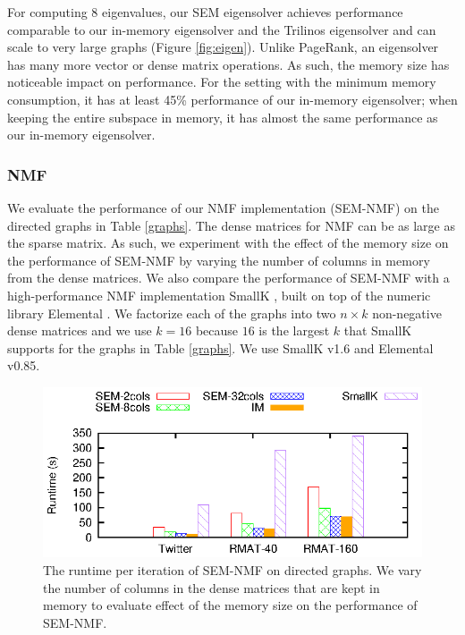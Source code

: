 For computing 8 eigenvalues, our SEM eigensolver achieves performance
comparable to our in-memory eigensolver and the Trilinos eigensolver
and can scale to very large graphs (Figure \ref{fig:eigen}).
Unlike PageRank, an eigensolver has many more vector or dense matrix operations.
As such, the memory size has noticeable impact on performance.
For the setting with the minimum memory consumption, it has at least 45\%
performance of our in-memory eigensolver; when keeping the entire subspace
in memory, it has almost the same performance as our in-memory eigensolver.

\subsubsection{NMF}
We evaluate the performance of our NMF implementation (SEM-NMF) on the directed
graphs in Table \ref{graphs}. The dense matrices for NMF can be as large as
the sparse matrix. As such, we experiment with the effect of the memory size on
the performance of SEM-NMF by varying the number of columns in memory from
the dense matrices. We also compare the performance of SEM-NMF with
a high-performance NMF implementation SmallK \cite{SmallK}, built on top of
the numeric library Elemental \cite{elemental}. We factorize
each of the graphs into two $n \times k$ non-negative dense matrices and
we use $k=16$ because $16$ is the largest $k$ that SmallK supports for
the graphs in Table \ref{graphs}. We use SmallK v1.6 and Elemental v0.85.

\begin{figure}
	\begin{center}
		\footnotesize
		\includegraphics[scale=1]{SpMM_figs/NMF.eps}
		\caption{The runtime per iteration of SEM-NMF on directed graphs.
			We vary the number of columns in the dense matrices that are kept
			in memory to evaluate effect of the memory size on the performance
		of SEM-NMF.}
		\label{perf:NMF}
	\end{center}
\end{figure}

